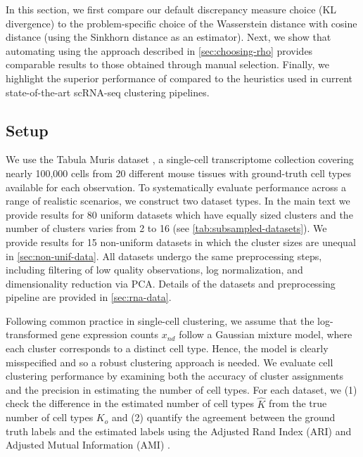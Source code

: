 In this section, we first compare our default discrepancy measure choice (KL divergence) to 
the problem-specific choice of the Wasserstein distance with cosine distance (using the Sinkhorn distance as an estimator). %
Next, we show that automating \methodname using the approach described in \cref{sec:choosing-rho} 
provides comparable results to those obtained through manual selection.
Finally, we highlight the superior performance of \methodname compared to the heuristics used 
in current state-of-the-art scRNA-seq clustering pipelines.

\subsection{Setup}

We use the Tabula Muris dataset \citep{mice}, a single-cell transcriptome collection covering nearly 100,000 cells from 20 different mouse tissues with ground-truth cell types available for each observation.
To systematically evaluate performance across a range of realistic scenarios, we construct two dataset types.
In the main text we provide results for 80 \textsf{uniform} datasets which have equally sized clusters and the number of clusters varies from 2 to 16 (see \cref{tab:subsampled-datasets}).
We provide results for 15 \textsf{non-uniform} datasets in which the cluster sizes are unequal in \cref{sec:non-unif-data}.
All datasets undergo the same preprocessing steps, including filtering of low quality observations, log normalization, and dimensionality reduction via PCA.
Details of the datasets and preprocessing pipeline are provided in \cref{sec:rna-data}.

Following common practice in single-cell clustering,  we assume that the log-transformed gene expression counts $x_{nd}$
follow a Gaussian mixture model, where each cluster corresponds to a distinct cell type.
Hence, the model is clearly misspecified and so a robust clustering approach is needed.
We evaluate cell clustering performance by examining both the accuracy of cluster assignments and the precision in estimating the number of cell types.
For each dataset, we (1) check the difference in the estimated number of cell types $\widehat K$ from the true
number of cell types $K_o$ and (2) quantify the agreement between the ground truth labels and the estimated labels using the Adjusted Rand Index (ARI) and Adjusted Mutual Information (AMI) \citep{ari,ami}.

